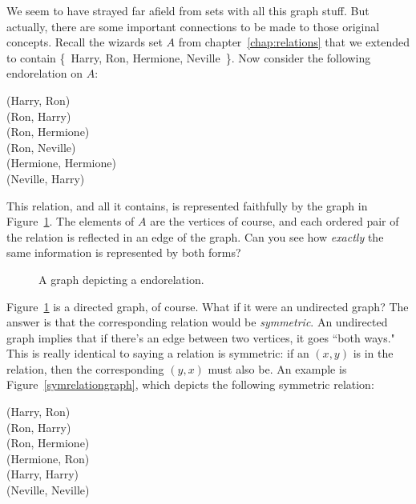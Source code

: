 We seem to have strayed far afield from sets with all this graph stuff. But
actually, there are some important connections to be made to those original
concepts. Recall the wizards set $A$ from chapter~\ref{chap:relations}
that we extended to contain \{~Harry, Ron, Hermione, Neville~\}. Now
consider the following endorelation on $A$:

\begin{center}
(Harry, Ron) \\
(Ron, Harry) \\
(Ron, Hermione) \\
(Ron, Neville) \\
(Hermione, Hermione) \\
(Neville, Harry)
\end{center}

This relation, and all it contains, is represented faithfully by the graph
in Figure~\ref{relationgraph}. The elements of $A$ are the vertices of
course, and each ordered pair of the relation is reflected in an edge of
the graph. Can you see how \textit{exactly} the same information is
represented by both forms?

\begin{figure}[ht]
\centering
{}
\caption{A graph depicting a endorelation.}
\label{relationgraph}
\end{figure}

Figure~\ref{relationgraph} is a directed graph, of course. What if it were
an undirected graph? The answer is that the corresponding relation would be
\textit{symmetric}. An undirected graph implies that if there's an edge
between two vertices, it goes ``both ways." This is really identical to
saying a relation is symmetric: if an $(x,y)$ is in the relation, then the
corresponding $(y,x)$ must also be. An example is
Figure~\ref{symrelationgraph}, which depicts the following symmetric
relation:

\begin{center}
(Harry, Ron) \\
(Ron, Harry) \\
(Ron, Hermione) \\
(Hermione, Ron) \\
(Harry, Harry) \\
(Neville, Neville)
\end{center}

